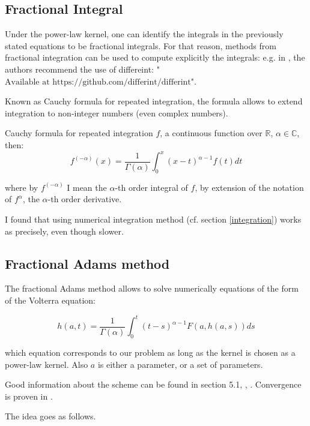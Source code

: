 \subsection{Fractional Integral}
Under the power-law kernel, one can identify the integrals in the previously stated equations to be fractional integrals. For that reason, methods from fractional integration can be used to compute explicitly the integrals: e.g. in \cite{HanWong}, the authors recommend the use of differeint: "$\text{Available at https://github.com/differint/differint}$". 

Known as Cauchy formula for repeated integration, the formula allows to extend integration to non-integer numbers (even complex numbers).

\begin{theoreme}{Cauchy formula for repeated integration}
$f$, a continuous function over $\mathbb R$, $\alpha \in \mathbb C$, then:
$$
f^{( - \alpha )} (x) = \frac 1 {\Gamma (\alpha)} \int_0^x (x-t)^{\alpha - 1} f(t) dt 
$$

where by $f^{( - \alpha )} $ I mean the $\alpha$-th order integral of $f$, by extension of the notation of $f^{ \alpha}$, the $\alpha$-th order derivative.
\end{theoreme}

I found that using numerical integration method (cf. section \ref{integration}) works as precisely, even though slower.










\subsection{Fractional Adams method}

The fractional Adams method allows to solve numerically equations of the form of the Volterra equation:

$$ h(a,t) = \frac 1 { \Gamma(\alpha)} \int_0^t (t-s)^{\alpha - 1} F ( a, h(a,s) ) ds $$

which equation corresponds to our problem as long as the kernel is chosen as a power-law kernel. Also $a$ is either a parameter, or a set of parameters.

Good information about the scheme can be found in \cite{Euch} section 5.1, \cite{Diethelm1}, \cite{Diethelm2}. Convergence is proven in \cite{convergence_psi}.

The idea goes as follows. 

